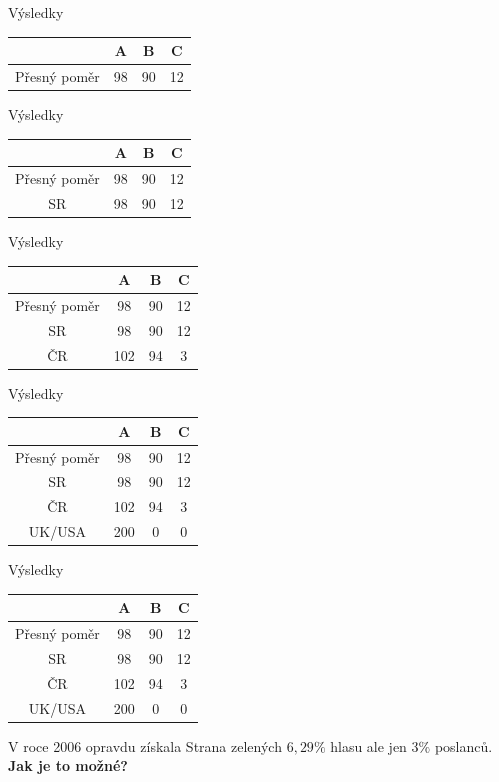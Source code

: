 \documentclass[17pt]{beamer}
\begin{document}
\begin{frame}{Výsledky}
\begin{center}
\begin{tabular}{|c|c|c|c|} \hline
  & A & B & C \\ \hline 
Přesný poměr & 98 & 90 & 12\\ \hline
\end{tabular}
\end{center} 
\end{frame}
\addtocounter{framenumber}{-1}
\begin{frame}{Výsledky}
\begin{center}
\begin{tabular}{|c|c|c|c|} \hline
  & A & B & C \\ \hline 
Přesný poměr & 98 & 90 & 12\\ \hline
SR & 98 & 90 & 12\\ \hline
\end{tabular}
\end{center} 
\end{frame}
\addtocounter{framenumber}{-1}
\begin{frame}{Výsledky}
\begin{center}
\begin{tabular}{|c|c|c|c|} \hline
  & A & B & C \\ \hline 
Přesný poměr & 98 & 90 & 12\\ \hline
SR & 98 & 90 & 12\\ \hline
ČR & 102 & 94 & 3\\ \hline
\end{tabular}
\end{center} 
\end{frame}
\addtocounter{framenumber}{-1}
\begin{frame}{Výsledky}
\begin{center}
\begin{tabular}{|c|c|c|c|} \hline
  & A & B & C \\ \hline 
Přesný poměr & 98 & 90 & 12\\ \hline
SR & 98 & 90 & 12\\ \hline
ČR & 102 & 94 & 3\\ \hline
UK/USA & 200 & 0 & 0\\ \hline
\end{tabular}
\end{center} 
\end{frame}
\addtocounter{framenumber}{-1}
\begin{frame}{Výsledky}
\begin{center}
\begin{tabular}{|c|c|c|c|} \hline
  & A & B & C \\ \hline 
Přesný poměr & 98 & 90 & 12\\ \hline
SR & 98 & 90 & 12\\ \hline
ČR & 102 & 94 & 3\\ \hline
UK/USA & 200 & 0 & 0\\ \hline
\end{tabular}
\end{center} 
V roce 2006 opravdu získala Strana zelených $6{,}29\%$ hlasu ale jen $3\%$ poslanců. 
\textbf{Jak je to možné?}
\end{frame}
\end{document}
